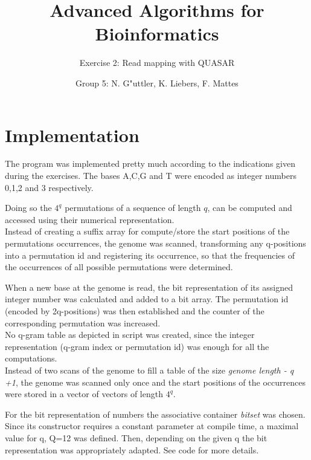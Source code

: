 \documentclass[11pt, notitlepage]{scrartcl}
\begin{document}
         


\title{Advanced Algorithms for Bioinformatics} 
\subtitle{Exercise 2: Read mapping with QUASAR}
\author{Group 5: N. G"uttler, K. Liebers, F. Mattes} %
\maketitle

\section{Implementation}
The program was implemented pretty much according to the indications given during the exercises. The bases A,C,G and T were encoded as integer numbers 0,1,2 and 3 respectively.

Doing so the $4^q$ permutations of a sequence of length $q$, can be computed and accessed using their numerical representation.\\ 
Instead of creating a suffix array for compute/store the start positions of the permutations occurrences, the genome was scanned, transforming any q-positions into a permutation id and registering its occurrence, so that the frequencies of the occurrences of all possible permutations were determined.

When a new base at the genome is read, the bit representation of  its assigned integer number was calculated and added to a bit array. The permutation id (encoded by 2q-positions) was then established and the counter of the corresponding permutation was increased. \\
No q-gram table as depicted in script was created, since the integer representation (q-gram index or permutation id) was enough for all the computations.\\ 
Instead of two scans of the genome to fill a table of the size \textit{genome length - q +1}, the genome was scanned only once and the start positions of the occurrences were stored in a vector of vectors of length $4^q$.

For the bit representation of numbers the associative container \textit{bitset} was chosen. Since its constructor requires a constant parameter at compile time, a maximal value for q, Q=12 was defined. Then, depending on the given q the bit representation was appropriately adapted. 
See code for more details.   
\end{document}
